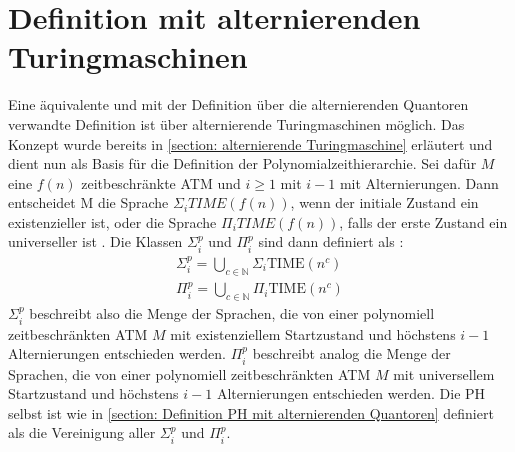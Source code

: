 \section{Definition mit alternierenden Turingmaschinen} \label{section: Definition PH mit ATM}
Eine äquivalente und mit der Definition über die alternierenden Quantoren verwandte Definition ist über alternierende Turingmaschinen möglich.
Das Konzept wurde bereits in \ref{section: alternierende Turingmaschine} erläutert und dient nun als Basis für die Definition der Polynomialzeithierarchie.
Sei dafür $M$ eine $f(n)$ zeitbeschränkte ATM und $i \geq 1$  mit $i - 1$ mit  Alternierungen. Dann entscheidet M die Sprache $\Sigma_i TIME(f(n))$, wenn der initiale Zustand ein existenzieller ist,
oder die Sprache $\Pi_i TIME(f(n))$, falls der erste Zustand ein universeller ist \cite{arora_computational_2009}.
Die Klassen $\Sigma^p_i$ und $\Pi^p_i$ sind dann definiert als \cite{arora_computational_2009}:
\begin{align*}
    \Sigma^p_i = \bigcup_{c \in \mathbb{N}} \Sigma_i \text{TIME}(n^c) \\
    \Pi^p_i = \bigcup_{c \in \mathbb{N}} \Pi_i \text{TIME}(n^c)
\end{align*}
$\Sigma^p_i$ beschreibt also die Menge der Sprachen, die von einer polynomiell zeitbeschränkten ATM $M$ mit existenziellem Startzustand und höchstens $i-1$ Alternierungen entschieden werden.
$\Pi^p_i$ beschreibt analog die Menge der Sprachen, die von einer polynomiell zeitbeschränkten ATM $M$ mit universellem Startzustand und höchstens $i-1$ Alternierungen entschieden werden.
Die PH selbst ist wie in \ref{section: Definition PH mit alternierenden Quantoren} definiert als die Vereinigung aller $\Sigma^p_i$ und $\Pi^p_i$.


